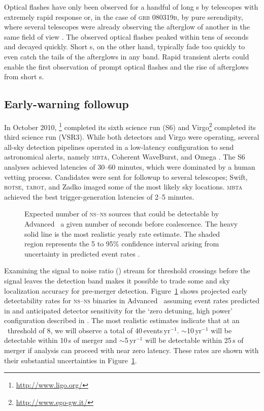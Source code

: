 Optical flashes have only been observed for a handful of long \GRB{}s
\citep{2011CRPhy..12..255A} by telescopes with extremely rapid response or, in
the case of \textsc{grb 080319b}, by pure serendipity, where several telescopes
were already observing the afterglow of another \GRB{} in the same field of
view \citep{2008Natur.455..183R}. The observed optical flashes peaked within
tens of seconds and decayed quickly.  Short \GRB{}s, on the other hand,
typically fade too quickly to even catch the tails of the afterglows in any
band. Rapid \GW{} transient alerts could enable the first observation of prompt
optical flashes and the rise of afterglows from short \GRB{}s.

\subsection{Early-warning \EM{} followup}

In October 2010, \LIGO{}\footnote{\url{http://www.ligo.org/}} completed its
sixth science run (S6) and Virgo\footnote{\url{http://www.ego-gw.it/}}
completed its third science run (VSR3).  While both \LIGO{} detectors and Virgo
were operating, several all-sky detection pipelines operated in a low-latency
configuration to send astronomical alerts, namely \textsc{mbta}, Coherent
WaveBurst, and Omega \citep{HugheyGWPAW2011, S6lowlatency}. The S6 analyses
achieved latencies of 30--60 minutes, which were dominated by a human vetting
process. Candidates were sent for \EM{} followup to several telescopes; Swift,
\textsc{rotse}, \textsc{tarot}, and Zadko \citep{kanner2008, HugheyGWPAW2011}
imaged some of the most likely sky locations.  \textsc{mbta} achieved the best
\GW{} trigger-generation latencies of 2--5 minutes.

\begin{figure}[h]
\caption{\label{fig:earlywarning}Expected number of \textsc{ns}--\textsc{ns}
sources that could be detectable by Advanced \LIGO\ a given number of seconds
before coalescence.  The heavy solid line is the most realistic yearly rate
estimate.  The shaded region represents the 5 to 95\% confidence interval
arising from uncertainty in predicted event rates \citep{Abadie:2010p10836}.}
\end{figure}
%
Examining the signal to noise ratio (\SNR{}) stream for threshold crossings
before the \GW{} signal leaves the detection band makes it possible to trade
some \SNR{} and sky localization accuracy for pre-merger detection.
Figure~\ref{fig:earlywarning} shows projected early detectability rates for
\textsc{ns}--\textsc{ns} binaries in Advanced \LIGO\ assuming event rates
predicted in \citet{Abadie:2010p10836} and anticipated detector sensitivity for
the `zero detuning, high power' configuration described in \citet{ALIGONoise}.
The most realistic estimates indicate that at an \SNR\ threshold of 8, we will
observe a total of 40\,events\,yr$^{-1}$. $\sim$10\,yr$^{-1}$ will be detectable
within 10\,s of merger and $\sim$5\,yr$^{-1}$ will be detectable within 25\,s of
merger if analysis can proceed with near zero latency. These rates are shown
with their substantial uncertainties in Figure~\ref{fig:earlywarning}.


